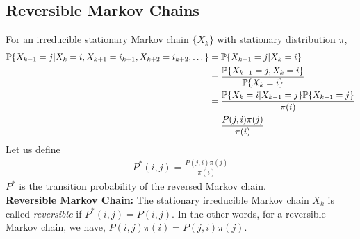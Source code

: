 \documentclass[all-lectures.tex]{subfiles}
\begin{document}
\subsection{Reversible Markov Chains}
For an irreducible  stationary Markov chain $\{X_k\}$ with stationary distribution $\pi$,
\begin{align*}
\P\{X_{k-1} = j| X_k = i,X_{k+1} = i_{k+1},X_{k+2} = i_{k+2},\dots\} &= \P\{X_{k-1} = j| X_k = i\} \\
&=  \frac{\P\{X_{k-1} = j, X_k = i\}}{\P\{ X_k = i\}} \\
&=  \frac{\P\{ X_k = i|X_{k-1} = j\}\P\{ X_{k-1} = j\}}{\pi(i)} \\
&=  \frac{P(j,i)\pi(j)}{\pi(i)}
\end{align*}
Let us define 
\begin{align*}
P^*(i,j)=\frac{P(j,i)\pi(j)}{\pi(i)}
\end{align*}
$P^*$ is the transition probability of the reversed Markov chain. \\
\indent \textbf{Reversible Markov Chain:} The stationary irreducible Markov chain $X_k$ is called \textit{reversible }if $P^*(i,j) = P(i,j)$. In the other words, for a reversible  Markov chain, we have, $P(i,j)\pi(i) = P(j,i)\pi(j)$.
\end{document}
